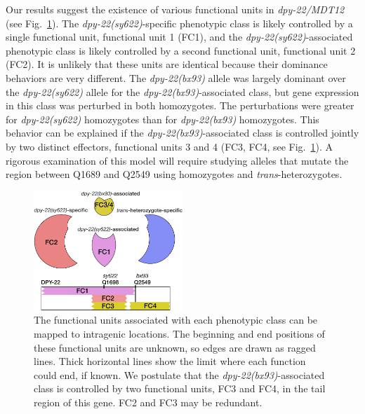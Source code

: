 \documentclass[8pt, twocolumn]{article}
\newcommand{\gene}[1]{\mbox{\emph{#1}}}
\newcommand{\dpy}[1]{\gene{dpy-22#1}}
\newcommand{\bx}{\dpy{(bx93)}}
\newcommand{\sy}{\dpy{(sy622)}}
\begin{document}
Our results suggest the existence of various functional units in \dpy{/MDT12}
(see Fig.~\ref{fig:domains}). The \sy{}-specific phenotypic class is likely
controlled by a single functional unit, functional unit 1 (FC1), and the
\sy{}-associated phenotypic class is likely controlled by a second
functional unit, functional unit 2 (FC2). It is unlikely that these units are
identical because their dominance behaviors are very different. The \bx{}
allele was largely dominant over the \sy{} allele for the
\bx{}-associated class, but gene expression in this class was perturbed in
both homozygotes. The perturbations were greater for \sy{} homozygotes
than for \bx{} homozygotes. This behavior can be explained if the
\bx{}-associated class is controlled jointly by two distinct effectors,
functional units 3 and 4 (FC3, FC4, see Fig.~\ref{fig:domains}). A rigorous
examination of this model will require studying alleles that mutate the region
between Q1689 and Q2549 using homozygotes and \emph{trans}-heterozygotes.


\begin{figure}
  \centering{}
  \includegraphics[width=0.5\textwidth]{../../figs/inferred_domains.pdf}
  \caption{
    The functional units associated with each phenotypic class can be
    mapped to intragenic locations. The beginning and end positions of
    these functional units are unknown,
    so edges are drawn as ragged lines. Thick horizontal lines show the
    limit where each function could end, if known. We postulate that the
    \bx{}-associated class is controlled by two functional units, FC3 and
    FC4, in the tail region of this gene. FC2 and FC3 may be redundant.
  }
\label{fig:domains}
\end{figure}
\end{document}
